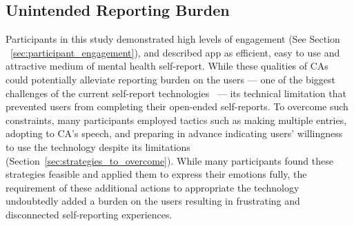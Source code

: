
    \subsection{Unintended Reporting Burden}
        
        Participants in this study demonstrated high levels of engagement (See Section ~\ref{sec:participant_engagement}), and described \acl{app} as efficient, easy to use and attractive medium of mental health self-report. While these qualities of \ac{CA}s could potentially alleviate reporting burden on the users --- one of the biggest challenges of the current self-report technologies~\cite{harari2016using, van2017experience, doherty2020design} --- its technical limitation that prevented users from completing their open-ended self-reports. To overcome such constraints, many participants employed tactics such as making multiple entries, adopting to \ac{CA}'s speech, and preparing in advance indicating users' willingness to use the technology despite its limitations (Section~\ref{sec:strategies_to_overcome}). While many participants found these strategies feasible and applied them to express their emotions fully, the requirement of these additional actions to appropriate the technology undoubtedly added a burden on the users resulting in frustrating and disconnected self-reporting experiences. 
        
        

